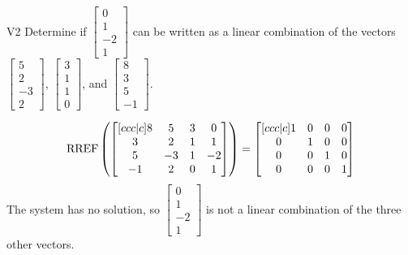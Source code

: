 \begin{problem}{V2}
Determine if \(\begin{bmatrix} 0 \\ 1 \\ -2 \\ 1 \end{bmatrix}\) can be written as a linear combination of the vectors \(\begin{bmatrix} 5 \\ 2 \\ -3 \\ 2 \end{bmatrix}\), \(\begin{bmatrix} 3 \\ 1 \\ 1 \\ 0 \end{bmatrix}\), and \(\begin{bmatrix} 8 \\ 3 \\ 5 \\ -1 \end{bmatrix}\).
\end{problem}
\begin{solution}

\[\operatorname{RREF} \left(\begin{bmatrix}[ccc|c] 8 & 5 & 3 & 0\\ 3 & 2 & 1 & 1 \\ 5 & -3 & 1 & -2  \\ -1 & 2 & 0 & 1 \end{bmatrix} \right) = \begin{bmatrix}[ccc|c] 1 & 0 & 0 & 0  \\ 0 &  1 & 0 & 0  \\ 0 & 0 & 1 & 0 \\ 0 & 0 & 0 & 1  \end{bmatrix}\]
The system has no solution, so \(\begin{bmatrix} 0 \\ 1 \\ -2 \\ 1 \end{bmatrix}\) is not a linear combination of the three other vectors.
\end{solution}


